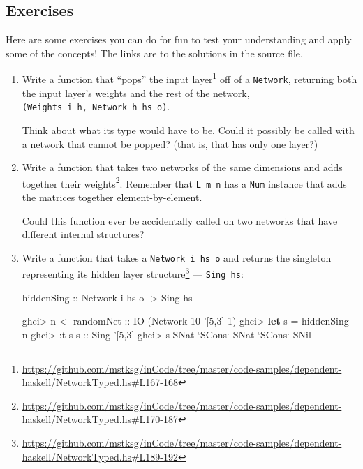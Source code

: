 \documentclass[]{article}
\newenvironment{Shaded}{\begin{snugshade}}{\end{snugshade}}
\newcommand{\CharTok}[1]{\textcolor[rgb]{0.31,0.60,0.02}{#1}}
\newcommand{\DataTypeTok}[1]{\textcolor[rgb]{0.13,0.29,0.53}{#1}}
\newcommand{\DecValTok}[1]{\textcolor[rgb]{0.00,0.00,0.81}{#1}}
\newcommand{\FunctionTok}[1]{\textcolor[rgb]{0.00,0.00,0.00}{#1}}
\newcommand{\KeywordTok}[1]{\textcolor[rgb]{0.13,0.29,0.53}{\textbf{#1}}}
\newcommand{\NormalTok}[1]{#1}
\newcommand{\OtherTok}[1]{\textcolor[rgb]{0.56,0.35,0.01}{#1}}
\renewcommand{\href}[2]{#2\footnote{\url{#1}}}
\begin{document}
\hypertarget{exercises}{%
\subsection{Exercises}\label{exercises}}

Here are some exercises you can do for fun to test your understanding and apply
some of the concepts! The links are to the solutions in the source file.

\begin{enumerate}
\def\labelenumi{\arabic{enumi}.}
\item
  Write a function that
  \href{https://github.com/mstksg/inCode/tree/master/code-samples/dependent-haskell/NetworkTyped.hs\#L167-168}{``pops''
  the input layer} off of a \texttt{Network}, returning both the input layer's
  weights and the rest of the network,
  \texttt{(Weights\ i\ h,\ Network\ h\ hs\ o)}.

  Think about what its type would have to be. Could it possibly be called with a
  network that cannot be popped? (that is, that has only one layer?)
\item
  Write a
  \href{https://github.com/mstksg/inCode/tree/master/code-samples/dependent-haskell/NetworkTyped.hs\#L170-187}{function
  that takes two networks of the same dimensions and adds together their
  weights}. Remember that \texttt{L\ m\ n} has a \texttt{Num} instance that adds
  the matrices together element-by-element.

  Could this function ever be accidentally called on two networks that have
  different internal structures?
\item
  Write a function that takes a \texttt{Network\ i\ hs\ o} and
  \href{https://github.com/mstksg/inCode/tree/master/code-samples/dependent-haskell/NetworkTyped.hs\#L189-192}{returns
  the singleton representing its hidden layer structure} --- \texttt{Sing\ hs}:

\begin{Shaded}
\begin{Highlighting}[]
\OtherTok{hiddenSing ::} \DataTypeTok{Network}\NormalTok{ i hs o }\OtherTok{->} \DataTypeTok{Sing}\NormalTok{ hs}
\end{Highlighting}
\end{Shaded}

\begin{Shaded}
\begin{Highlighting}[]
\NormalTok{ghci}\FunctionTok{>}\NormalTok{ n }\OtherTok{<- randomNet ::} \DataTypeTok{IO}\NormalTok{ (}\DataTypeTok{Network} \DecValTok{10} \CharTok{'[5,3] 1)}
\NormalTok{ghci}\FunctionTok{>} \KeywordTok{let}\NormalTok{ s }\FunctionTok{=}\NormalTok{ hiddenSing n}
\NormalTok{ghci}\FunctionTok{>} \FunctionTok{:}\NormalTok{t s}
\OtherTok{s ::} \DataTypeTok{Sing} \CharTok{'[5,3]}
\NormalTok{ghci}\FunctionTok{>}\NormalTok{ s}
\DataTypeTok{SNat} \OtherTok{`SCons`} \DataTypeTok{SNat} \OtherTok{`SCons`} \DataTypeTok{SNil}
\end{Highlighting}
\end{Shaded}
\end{enumerate}
\end{document}
